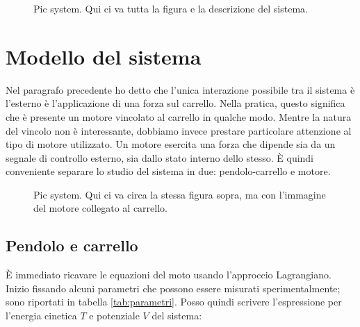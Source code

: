 \begin{figure}[thb]
    \centering
    \caption{Pic system. Qui ci va tutta la figura e la descrizione del sistema. }%
    \label{fig:pic}
\end{figure}




\section{Modello del sistema}
Nel paragrafo precedente ho detto che l'unica interazione possibile tra il sistema è l'esterno è l'applicazione di una forza sul carrello. Nella pratica, questo significa che è presente un motore vincolato al carrello in qualche modo. Mentre la natura del vincolo non è interessante, dobbiamo invece prestare particolare attenzione al tipo di motore utilizzato. Un motore esercita una forza che dipende sia da un segnale di controllo esterno, sia dallo stato interno dello stesso. È quindi conveniente separare lo studio del sistema in due: pendolo-carrello e motore.

\begin{figure}[thb]
    \centering
    \caption{Pic system. Qui ci va circa la stessa figura sopra, ma con l'immagine del motore collegato al carrello. }%
    \label{fig:pic-real}
\end{figure}

\subsection{Pendolo e carrello}
È immediato ricavare le equazioni del moto usando l'approccio Lagrangiano. Inizio fissando alcuni parametri che possono essere misurati sperimentalmente; sono riportati in tabella \ref{tab:parametri}. Posso quindi scrivere l'espressione per l'energia cinetica $T$ e potenziale $V$ del sistema:

